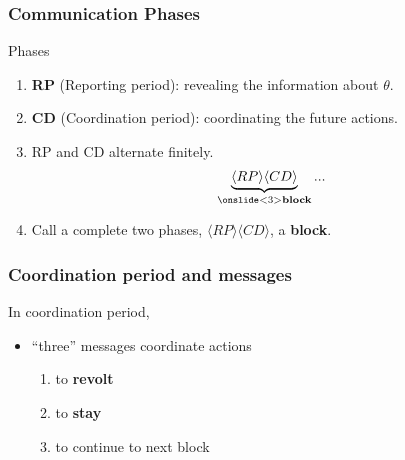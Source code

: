 \documentclass[9pt]{beamer}
\begin{document}
\begin{frame}
  \frametitle{Communication Phases}

\pause
Phases 
\begin{enumerate}
\item<1-> \textbf{RP} (Reporting period): revealing the information about $\theta$. 
\item<1-> \textbf{CD} (Coordination period): coordinating the future actions.
\item<2-> RP and CD alternate finitely.
\[\underbrace{\langle RP \rangle \langle CD \rangle}_{\onslide<3>{\textbf{{block}}}}...\]
\item<3> Call a complete two phases, $\langle RP \rangle \langle CD \rangle$, a \textbf{block}. 
\end{enumerate}







\end{frame}








\begin{frame}


\frametitle{Coordination period and messages}

\pause
In coordination period, 
\begin{itemize}
\item ``three'' messages coordinate actions
\begin{enumerate}
\item to \textbf{revolt}
\item to \textbf{stay}
\item to continue to next block 
\end{enumerate}
\end{itemize}



\end{frame}
\end{document}

